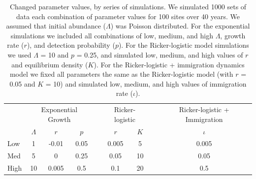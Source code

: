 \documentclass[12pt]{article}
\begin{document}
\begin{table}[t]
  \centering
\caption{Changed parameter values, by series of simulations.  We
simulated 1000 sets of data each combination of parameter values
for 100 sites over 40 years.  We assumed that initial abundance
($\Lambda$) was Poisson distributed.  For the exponential 
simulations we included all combinations of low, medium, and
high $\Lambda$, growth rate ($r$), and detection probability ($p$).
For the Ricker-logistic model simulations we used $\Lambda$ = 10 and $p$ = 0.25, and
simulated low, medium, and high values of $r$ and equilibrium density ($K$).
For the Ricker-logistic + immigration dynamics model we fixed all parameters the
same as the Ricker-logistic model (with $r$ = 0.05 and $K$ = 10) and
simulated low, medium, and high values of immigration rate ($\iota$).}  
\begin{tabular}{lcccccccc}
    \hline
    & \multicolumn{3}{c}{Exponential Growth} && \multicolumn{2}{c}{Ricker-logistic} &&
    Ricker-logistic + Immigration \\
    \cline{2-4}     \cline{6-7}    \cline{9-9}
& $\Lambda$ & $r$ & $p$ && $r$  & $K$ && $\iota$  \\    
\hline
    Low	        &1	&-0.01	&0.05	&&0.005	 &5	&&0.005  \\
    Med	        &5	&0	&0.25	&&0.05	&10	&&0.05   \\
    High		 &10 &0.005	&0.5	&&0.1	&20	&&0.5    \\
    \hline
  \end{tabular}
\end{table}

\vfill
\newpage
\end{document}
